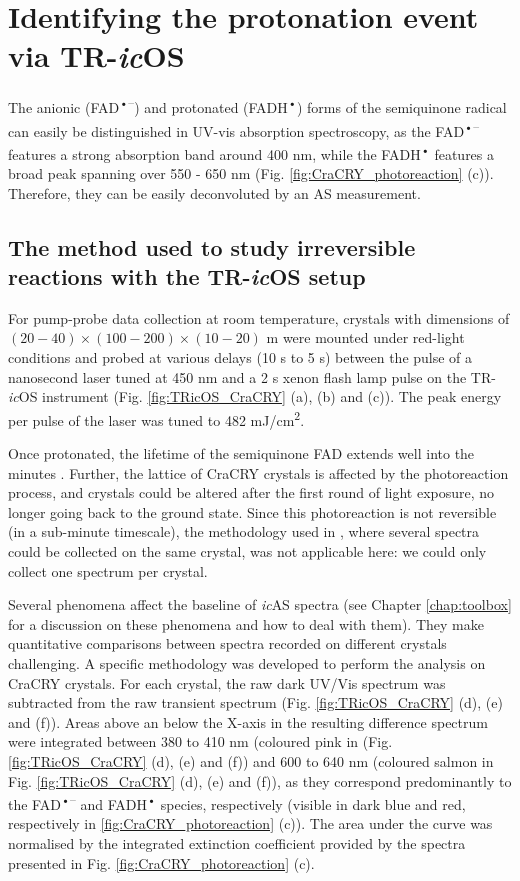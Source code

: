\section{Identifying the protonation event via TR-\textit{ic}OS}\label{sec:CraCRY_TR-icOS}

The anionic (FAD\textsuperscript{•–}) and protonated (FADH\textsuperscript{•}) forms of the semiquinone radical can easily be distinguished in UV-vis absorption spectroscopy, as the FAD\textsuperscript{•–} features a strong absorption band around 400 nm, while the FADH\textsuperscript{•} features a broad peak spanning over 550 - 650 nm (Fig. \ref{fig:CraCRY_photoreaction} (c)). Therefore, they can be easily deconvoluted by an AS measurement. 

\subsection{The method used to study irreversible reactions with the TR-\textit{ic}OS setup}

For pump-probe data collection at room temperature, crystals with dimensions of \((20-40) \times (100-200) \times (10-20)\) \textmu m were mounted under red-light conditions and probed at various delays (10 \textmu s to 5 s) between the pulse of a nanosecond laser tuned at 450 nm and a 2 \textmu s xenon flash lamp pulse on the TR-\textit{ic}OS instrument (Fig. \ref{fig:TRicOS_CraCRY} (a), (b) and (c)). The peak energy per pulse of the laser was tuned to 482 mJ/cm\textsuperscript{2}.

Once protonated, the lifetime of the semiquinone FAD extends well into the minutes \parencite{lacombatUltrafastOxidationTyrosine2019}. Further, the lattice of CraCRY crystals is affected by the photoreaction process, and crystals could be altered after the first round of light exposure, no longer going back to the ground state. Since this photoreaction is not reversible (in a sub-minute timescale), the methodology used in \cite{engilbergeTRicOSSetupESRF2024}, where several spectra could be collected on the same crystal, was not applicable here: we could only collect one spectrum per crystal.

Several phenomena affect the baseline of \textit{ic}AS spectra (see Chapter \ref{chap:toolbox} for a discussion on these phenomena and how to deal with them). They make quantitative comparisons between spectra recorded on different crystals challenging. A specific methodology was developed to perform the analysis on CraCRY crystals. For each crystal, the raw dark UV/Vis spectrum was subtracted from the raw transient spectrum (Fig. \ref{fig:TRicOS_CraCRY} (d), (e) and (f)). Areas above an below the X-axis in the resulting difference spectrum were integrated between 380 to 410 nm (coloured pink in (Fig. \ref{fig:TRicOS_CraCRY} (d), (e) and (f)) and 600 to 640 nm (coloured salmon in Fig. \ref{fig:TRicOS_CraCRY} (d), (e) and (f)), as they correspond predominantly to the FAD\textsuperscript{•–} and FADH\textsuperscript{•} species, respectively (visible in dark blue and red, respectively in \ref{fig:CraCRY_photoreaction} (c)). The area under the curve was normalised by the integrated extinction coefficient provided by the spectra presented in Fig. \ref{fig:CraCRY_photoreaction} (c).

